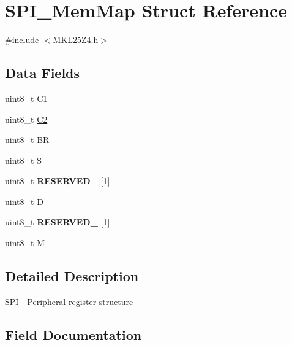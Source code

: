 \hypertarget{struct_s_p_i___mem_map}{}\section{S\+P\+I\+\_\+\+Mem\+Map Struct Reference}
\label{struct_s_p_i___mem_map}


{\ttfamily \#include $<$M\+K\+L25\+Z4.\+h$>$}

\subsection*{Data Fields}
\begin{DoxyCompactItemize}
\item 
uint8\+\_\+t \hyperlink{struct_s_p_i___mem_map_ab9f017bddfa72e299d9c0ab7ab400c1b}{C1}
\item 
uint8\+\_\+t \hyperlink{struct_s_p_i___mem_map_aae7ca381054324cf98aac30ce607046a}{C2}
\item 
uint8\+\_\+t \hyperlink{struct_s_p_i___mem_map_ad2c201cf5aa72904503df243610507b8}{BR}
\item 
uint8\+\_\+t \hyperlink{struct_s_p_i___mem_map_ad905fa29c8b2f0ca5b93222e7961542b}{S}
\item 
\mbox{\label{struct_s_p_i___mem_map_a389ec0465af8c44c5e4f4faaad940f8c}} 
uint8\+\_\+t {\bfseries R\+E\+S\+E\+R\+V\+E\+D\+\_} \mbox{[}1\mbox{]}
\item 
uint8\+\_\+t \hyperlink{struct_s_p_i___mem_map_aa940ca36df1b702c6c03557f442cde16}{D}
\item 
\mbox{\label{struct_s_p_i___mem_map_ad5fafb348f6501bbb48ed41bd58f4aab}} 
uint8\+\_\+t {\bfseries R\+E\+S\+E\+R\+V\+E\+D\+\_} \mbox{[}1\mbox{]}
\item 
uint8\+\_\+t \hyperlink{struct_s_p_i___mem_map_acd26c314a794ed500a27a4b6bc51eec9}{M}
\end{DoxyCompactItemize}


\subsection{Detailed Description}
S\+PI -\/ Peripheral register structure 

\subsection{Field Documentation}
\mbox{\label{struct_s_p_i___mem_map_ad2c201cf5aa72904503df243610507b8}} 
